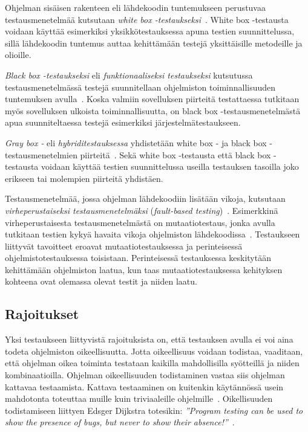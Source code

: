 \documentclass[finnish, grading]{tktltiki2}
\theoremstyle{definition}
\theoremstyle{remark}
\begin{document}
Ohjelman sisäisen rakenteen eli lähdekoodin tuntemukseen perustuvaa testausmenetelmää kutsutaan \textit{white box -testaukseksi}~\cite[s. 52]{Binder:1999}. White box -testausta voidaan käyttää esimerkiksi yksikkötestauksessa apuna testien suunnittelussa, sillä lähdekoodin tuntemus auttaa kehittämään testejä yksittäisille metodeille ja olioille.

\textit{Black box -testaukseksi} eli \textit{funktionaaliseksi testaukseksi} kutsutussa testausmenetelmässä testejä suunnitellaan ohjelmiston toiminnallisuuden tuntemuksen avulla~\cite[s. 52]{Binder:1999}. Koska valmiin sovelluksen piirteitä testattaessa tutkitaan myös sovelluksen ulkoista toiminnallisuutta, on black box -testausmenetelmästä apua suunniteltaessa testejä esimerkiksi järjestelmätestaukseen.

\textit{Gray box -} eli \textit{hybriditestauksessa} yhdistetään white box - ja black box -testausmenetelmien piirteitä~\cite[s. 52]{Binder:1999}. Sekä white box -testausta että black box -testausta voidaan käyttää testien suunnittelussa useilla testauksen tasoilla joko erikseen tai molempien piirteitä yhdistäen.

Testausmenetelmää, jossa ohjelman lähdekoodiin lisätään vikoja, kutsutaan \textit{virheperustaiseksi testausmenetelmäksi} (\textit{fault-based testing})~\cite[s. 52]{Binder:1999}. Esimerkkinä virheperustaisesta testausmenetelmästä on mutaatiotestaus, jonka avulla tutkitaan testien kykyä havaita vikoja ohjelmiston lähdekoodissa~\cite[s. 36]{DeMillo:Lipton:Sayward:1978}. Testaukseen liittyvät tavoitteet eroavat mutaatiotestauksessa ja perinteisessä ohjelmistotestauksessa toisistaan. Perinteisessä testauksessa keskitytään kehittämään ohjelmiston laatua, kun taas mutaatiotestauksessa kehityksen kohteena ovat olemassa olevat testit ja niiden laatu.

\subsection{Rajoitukset}

Yksi testaukseen liittyvistä rajoituksista on, että testauksen avulla ei voi aina todeta ohjelmiston oikeellisuutta. Jotta oikeellisuus voidaan todistaa, vaaditaan, että ohjelman oikea toiminta testataan kaikilla mahdollisilla syötteillä ja niiden kombinaatioilla. Ohjelman oikeellisuuden todistaminen vastaa siis ohjelman kattavaa testaamista. Kattava testaaminen on kuitenkin käytännössä usein mahdotonta toteuttaa muille kuin triviaaleille ohjelmille~\cite[s. 58]{Binder:1999}. Oikellisuuden todistamiseen liittyen Edsger Dijkstra totesikin: \textit{''Program testing can be used to show the presence of bugs, but never to show their absence!''}~\cite[s. 6]{Dahl:Dijkstra:Hoare:1972}.
\end{document}
